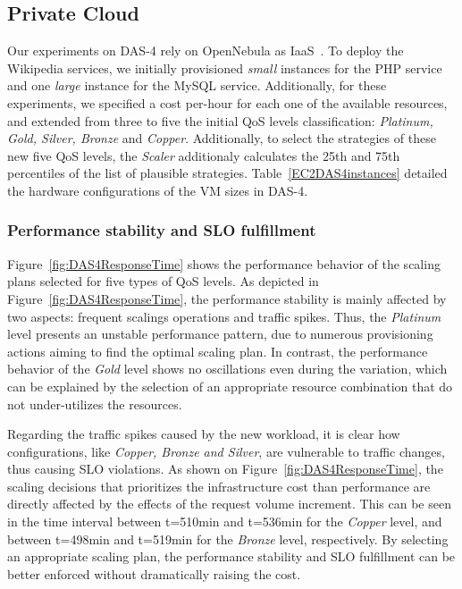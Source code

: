 

\subsection{Private Cloud}

Our experiments on DAS-4 rely on OpenNebula as IaaS~\cite{sotomayor_virtual_2009}. To deploy the Wikipedia services, we initially provisioned \emph{small} instances for the PHP service and one \emph{large} instance for the MySQL service. Additionally, for these experiments, we specified a cost per-hour for each one of the available resources, and extended from three to five the initial QoS levels classification: \emph{Platinum, Gold, Silver, Bronze} and \emph{Copper}. Additionally, to select the strategies of these new five QoS levels, the \emph{Scaler} additionaly calculates the 25th and 75th percentiles of the list of plausible strategies. Table~\ref{EC2DAS4instances} detailed the hardware configurations of the VM sizes in DAS-4.




\subsubsection{Performance stability and SLO fulfillment}

Figure~\ref{fig:DAS4ResponseTime} shows the performance behavior of the scaling plans selected for five types of QoS levels. As depicted in Figure~\ref{fig:DAS4ResponseTime}, the performance stability is mainly affected by two aspects: frequent scalings operations and traffic spikes. Thus, the \emph{Platinum} level presents an unstable performance pattern, due to numerous provisioning actions aiming to find the optimal scaling plan. In contrast, the performance behavior of the \emph{Gold} level shows no oscillations even during the variation, which can be explained by the selection of an appropriate resource combination that do not under-utilizes the resources.



Regarding the traffic spikes caused by the new workload, it is clear how configurations, like \emph{Copper, Bronze and Silver}, are vulnerable to traffic changes, thus causing SLO violations. As shown on Figure~\ref{fig:DAS4ResponseTime},  the scaling decisions that prioritizes the infrastructure cost than performance are directly affected by the effects of the request volume increment. This can be seen in the time interval between t=510min and t=536min for the \emph{Copper} level, and between t=498min and t=519min for the \emph{Bronze} level, respectively. By selecting an appropriate scaling plan, the performance stability and SLO fulfillment can be better enforced without dramatically raising the cost.

